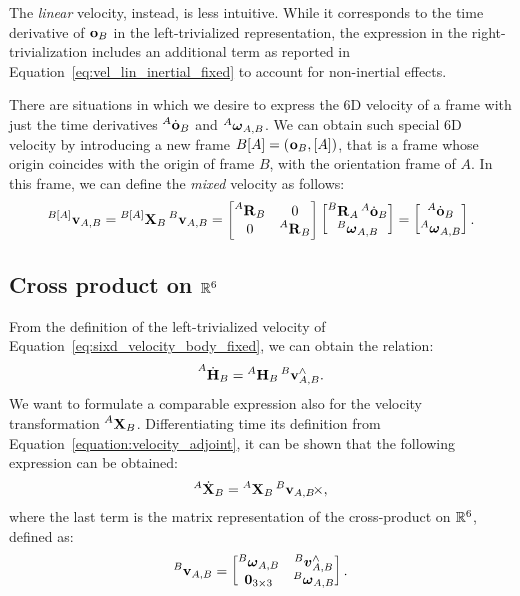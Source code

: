 The \emph{linear} velocity, instead, is less intuitive.
While it corresponds to the time derivative of $\ori_B$ in the left-trivialized representation, the expression in the right-trivialization includes an additional term as reported in Equation~\eqref{eq:vel_lin_inertial_fixed} to account for non-inertial effects.

There are situations in which we desire to express the 6D velocity of a frame with just the time derivatives $\orid[A]_B$ and $\velang[A]_{A,B}$.
We can obtain such special 6D velocity by introducing a new frame $B[A] = (\ori_B, [A])$, that is a frame whose origin coincides with the origin of frame $B$, with the orientation frame of $A$.
In this frame, we can define the \emph{mixed} velocity as follows:
%
\begin{equation}
    \label{eq:mixed_velocity}
    \velsix[{B[A]}]_{A,B} =
    \transvel[{B[A]}]_B \velsix[B]_{A,B} =
    \begin{bmatrix}
        \rot[A]_B & 0 \\ 0 & \rot[A]_B
    \end{bmatrix}
    \begin{bmatrix}
        \rot[B]_A \orid[A]_B \\ \velang[B]_{A,B}
    \end{bmatrix}
    =
    \begin{bmatrix}
        \orid[A]_B \\ \velang[A]_{A,B}
    \end{bmatrix}
    .
\end{equation}

\subsection{Cross product on $\realn^6$}

From the definition of the left-trivialized velocity of Equation~\eqref{eq:sixd_velocity_body_fixed}, we can obtain the relation:
%
\begin{equation*}
    \homod[A]_B = \homo[A]_B \velsix[B]_{A,B}^\wedge
    .
\end{equation*}
%
We want to formulate a comparable expression also for the velocity transformation $\transvel[A]_B$.
Differentiating \wrtl time its definition from Equation~\eqref{equation:velocity_adjoint}, it can be shown that the following expression can be obtained:
%
\begin{equation}
    \label{eq:X_dot}
    {}^A \dot{\mathbf{X}}_B = \transvel[A]_B \crossvelsix[{\velsix[B]_{A,B}}]
    ,
\end{equation}
%
where the last term is the matrix representation of the cross-product on $\realn^6$, defined as:
%
\begin{equation*}
    \velsix[B]_{A,B} =
    \begin{bmatrix}
        \velang[B]_{A,B} & \vellin[B]_{A,B}^\wedge \\
        \zeros_{3\times 3} & \velang[B]_{A,B}
    \end{bmatrix}
    .
\end{equation*}

